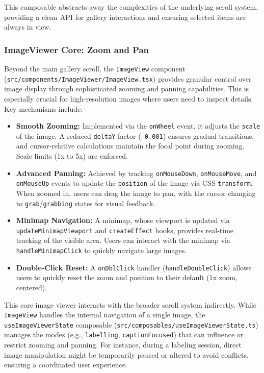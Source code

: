 \documentclass[10pt]{article}
\begin{document}
This composable abstracts away the complexities of the underlying scroll system, providing a clean API for gallery interactions and ensuring selected items are always in view.

\subsubsection{ImageViewer Core: Zoom and Pan}

Beyond the main gallery scroll, the \texttt{ImageView} component (\texttt{src/components/ImageViewer/ImageView.tsx}) provides granular control over image display through sophisticated zooming and panning capabilities. This is especially crucial for high-resolution images where users need to inspect details. Key mechanisms include:
\begin{itemize}
    \item \textbf{Smooth Zooming:} Implemented via the \texttt{onWheel} event, it adjusts the \texttt{scale} of the image. A reduced \texttt{deltaY} factor (\texttt{-0.001}) ensures gradual transitions, and cursor-relative calculations maintain the focal point during zooming. Scale limits (1x to 5x) are enforced.
    \item \textbf{Advanced Panning:} Achieved by tracking \texttt{onMouseDown}, \texttt{onMouseMove}, and \texttt{onMouseUp} events to update the \texttt{position} of the image via CSS \texttt{transform}. When zoomed in, users can drag the image to pan, with the cursor changing to \texttt{grab}/\texttt{grabbing} states for visual feedback.
    \item \textbf{Minimap Navigation:} A minimap, whose viewport is updated via \texttt{updateMinimapViewport} and \texttt{createEffect} hooks, provides real-time tracking of the visible area. Users can interact with the minimap via \texttt{handleMinimapClick} to quickly navigate large images.
    \item \textbf{Double-Click Reset:} A \texttt{onDblClick} handler (\texttt{handleDoubleClick}) allows users to quickly reset the zoom and position to their default (1x zoom, centered).
\end{itemize}

This core image viewer interacts with the broader scroll system indirectly. While \texttt{ImageView} handles the internal navigation of a single image, the \texttt{useImageViewerState} composable (\texttt{src/composables/useImageViewerState.ts}) manages the modes (e.g., \texttt{labelling}, \texttt{captionFocused}) that can influence or restrict zooming and panning. For instance, during a labeling session, direct image manipulation might be temporarily paused or altered to avoid conflicts, ensuring a coordinated user experience.
\end{document}
